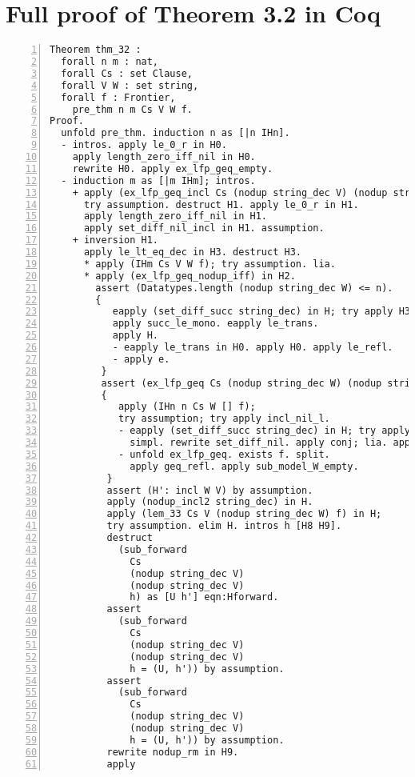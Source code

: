 \chapter{Full proof of Theorem 3.2 in Coq}

\begin{lstlisting}[language=Coq, label={lst:thm32}, caption={Full proof of Theorem 3.2 in Coq}, numbers=left]
Theorem thm_32 :
  forall n m : nat,
  forall Cs : set Clause,
  forall V W : set string,
  forall f : Frontier,
    pre_thm n m Cs V W f.
Proof.
  unfold pre_thm. induction n as [|n IHn].
  - intros. apply le_0_r in H0.
    apply length_zero_iff_nil in H0.
    rewrite H0. apply ex_lfp_geq_empty.
  - induction m as [|m IHm]; intros.
    + apply (ex_lfp_geq_incl Cs (nodup string_dec V) (nodup string_dec W));
      try assumption. destruct H1. apply le_0_r in H1.
      apply length_zero_iff_nil in H1.
      apply set_diff_nil_incl in H1. assumption.
    + inversion H1.
      apply le_lt_eq_dec in H3. destruct H3.
      * apply (IHm Cs V W f); try assumption. lia.
      * apply (ex_lfp_geq_nodup_iff) in H2.
        assert (Datatypes.length (nodup string_dec W) <= n).
        {
           eapply (set_diff_succ string_dec) in H; try apply H3.
           apply succ_le_mono. eapply le_trans.
           apply H.
           - eapply le_trans in H0. apply H0. apply le_refl.
           - apply e.
         }
         assert (ex_lfp_geq Cs (nodup string_dec W) (nodup string_dec W) f).
         {
            apply (IHn n Cs W [] f);
            try assumption; try apply incl_nil_l.
            - eapply (set_diff_succ string_dec) in H; try apply H3.
              simpl. rewrite set_diff_nil. apply conj; lia. apply e.
            - unfold ex_lfp_geq. exists f. split.
              apply geq_refl. apply sub_model_W_empty.
          }
          assert (H': incl W V) by assumption.
          apply (nodup_incl2 string_dec) in H.
          apply (lem_33 Cs V (nodup string_dec W) f) in H;
          try assumption. elim H. intros h [H8 H9].
          destruct
            (sub_forward
              Cs
              (nodup string_dec V)
              (nodup string_dec V)
              h) as [U h'] eqn:Hforward.
          assert
            (sub_forward
              Cs
              (nodup string_dec V)
              (nodup string_dec V)
              h = (U, h')) by assumption.
          assert
            (sub_forward
              Cs
              (nodup string_dec V)
              (nodup string_dec V)
              h = (U, h')) by assumption.
          rewrite nodup_rm in H9.
          apply

\end{lstlisting}
